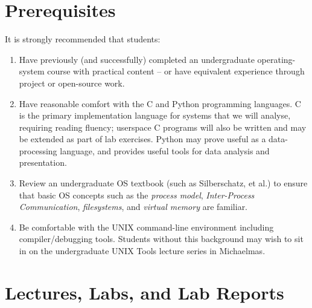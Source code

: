 \documentclass[a4paper,10pt]{article}
\begin{document}
\section{Prerequisites}

It is strongly recommended that students:

\begin{enumerate}
\item Have previously (and successfully) completed an undergraduate
  operating-system course with practical content -- or have equivalent
  experience through project or open-source work.
\item Have reasonable comfort with the C and Python programming languages.
  C is the primary implementation language for systems that we will analyse,
  requiring reading fluency; userspace C programs will also be written and may
  be extended as part of lab exercises.
  Python may prove useful as a data-processing language, and provides useful
  tools for data analysis and presentation.
\item Review an undergraduate OS textbook (such as Silberschatz, et al.) to
  ensure that basic OS concepts such as the \textit{process model},
  \textit{Inter-Process Communication}, \textit{filesystems}, and
  \textit{virtual memory} are familiar.
\item Be comfortable with the UNIX command-line environment including
  compiler/debugging tools.
  Students without this background may wish to sit in on the undergraduate
  UNIX Tools lecture series in Michaelmas.
\end{enumerate}

\section{Lectures, Labs, and Lab Reports}
\end{document}
